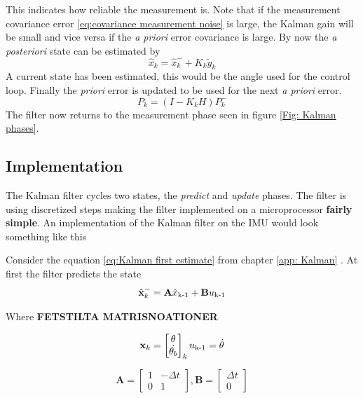 \documentclass[a4paper,11pt]{kth-mag}
\begin{document}
This indicates how reliable the measurement is. Note that if the measurement covariance error \eqref{eq:covariance measurement noise} is large, the Kalman gain will be small and vice versa if the \textit{a priori} error covariance is large.
By now the \textit{a posteriori} state can be estimated by
\begin{equation}
\hat{x}_k = \hat{x}^-_k + K_k\tilde{y}_k
\end{equation}
A current state has been estimated, this would be the angle used for the control loop. Finally the \textit{priori} error is updated to be used for the next \textit{a priori} error.
\begin{equation}
P_k=(I-K_kH)P^-_k
\end{equation} 
The filter now returns to the measurement phase seen in figure \ref{Fig: Kalman phases}.


\subsection{Implementation}
\label{app: Kalman imp}
The Kalman filter cycles two states, the \textit{predict} and \textit{update} phases. The filter is using discretized steps making the filter implemented on a microprocessor \textbf{fairly simple}. 
An implementation of the Kalman filter on the IMU would look something like this

Consider the equation \eqref{eq:Kalman first estimate} from chapter \ref{app: Kalman} . At first the filter predicts the state
\begin{equation}
\hat{\textbf{x}}^-_k = \textbf{A}\hat{x}\textsubscript{k-1}+\textbf{B}u\textsubscript{k-1}
\end{equation}

Where   \textbf{FETSTILTA MATRISNOATIONER}

\begin{equation}
\textbf{x}_k = \begin{bmatrix}
\theta \\
\dot{\theta_b}
\end{bmatrix}_k
u\textsubscript{k-1} = \dot{\theta}
\end{equation}

\begin{equation}
\textbf{A} = \begin{bmatrix}
1  & -\Delta t \\
0   & 1
\end{bmatrix}
,
\textbf{B} = \begin{bmatrix}
\Delta t \\ 0
\end{bmatrix}
\end{equation}
\end{document}
